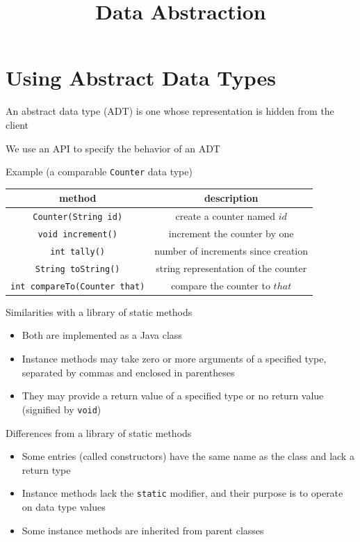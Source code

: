\documentclass[8pt,a4paper,compress]{beamer}
\title{Data Abstraction}
\date{}
\begin{document}
\begin{frame}
\vfill
\titlepage
\end{frame}

\section{Using Abstract Data Types}
\begin{frame}[fragile]
\pause

An abstract data type (ADT) is one whose representation is hidden from the client

\pause\bigskip

We use an API to specify the behavior of an ADT

\pause\bigskip

Example (a comparable \lstinline{Counter} data type)
\begin{center}
\begin{tabular}{cc}
method & description \\ \hline
\lstinline$Counter(String id)$ & create a counter named $id$ \\
\lstinline$void increment()$ & increment the counter by one \\
\lstinline$int tally()$ & number of increments since creation \\
\lstinline$String toString()$ & string representation of the counter \\
\lstinline$int compareTo(Counter that)$ & compare the counter to $that$
\end{tabular} 
\end{center}
\end{frame}

\begin{frame}[fragile]
\pause

Similarities with a library of static methods
\begin{itemize}
\pause
\item Both are implemented as a Java class

\pause
\item Instance methods may take zero or more arguments of a specified type, separated by commas and enclosed in parentheses

\pause
\item They may provide a return value of a specified type or no return value (signified by \lstinline{void})
\end{itemize}

\pause\bigskip

Differences from a library of static methods
\begin{itemize}
\pause
\item Some entries (called constructors) have the same name as the class and lack a return type

\pause
\item Instance methods lack the \lstinline{static} modifier, and their purpose is to operate on data type values

\pause
\item Some instance methods are inherited from parent classes
\end{itemize}
\end{frame}
\end{document}

